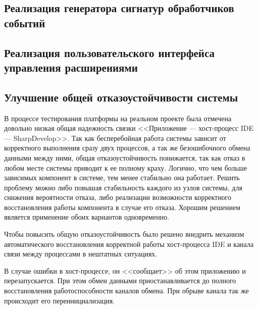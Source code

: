 
\subsection{Реализация генератора сигнатур обработчиков событий}
\label{sec:ehsg}



\subsection{Реализация пользовательского интерфейса управления расширениями}
\label{sec:macro-gui}


 
\subsection{Улучшение общей отказоустойчивости системы}
\label{sec:stability}

В процессе тестирования платформы на реальном проекте была отмечена довольно низкая общая надежность связки <<Приложение --- хост-процесс IDE --- SharpDevelop>>. Так как бесперебойная работа системы зависит от корректного выполнения сразу двух процессов, а так же безошибочного обмена данными между ними, общая отказоустойчивость понижается, так как отказ в любом месте системы приводит к ее полному краху. Логично, что чем больше зависимых компонент в системе, тем менее стабильно она работает. Решить проблему можно либо повышая стабильность каждого из узлов системы, для снижения вероятности отказа, либо реализации возможности корректного восстановления работы компонента в случае его отказа. Хорошим решением является применение обоих вариантов одновременно.

Чтобы повысить общую отказоустойчивость было решено внедрить механизм автоматического восстановления корректной работы хост-процесса IDE и канала связи между процессами в нештатных ситуациях.

В случае ошибки в хост-процессе, он <<сообщает>> об этом приложению и перезапускается. При этом обмен данными приостанавливается до полного восстановления работоспособности каналов обмена. При обрыве канала так же происходит его переинициализация.


\pagebreak